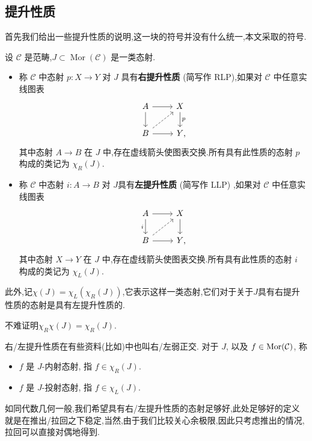 \subsection{提升性质}
首先我们给出一些提升性质的说明,这一块的符号并没有什么统一,本文采取\cite{Land}的符号.
\begin{definition}[提升性质]
    设 $\mathcal{C}$ 是范畴,$J\subset\operatorname{Mor}(\mathcal{C})$ 是一类态射.
    \begin{itemize}
        \item
            称 $\mathcal{C}$ 中态射 $p : X \to Y$ 对 $J$ 具有\textbf{右提升性质} (简写作 RLP),如果对 $\mathcal{C}$ 中任意实线图表
            \[
                \begin{tikzcd}
                    A \ar[r] \ar[d] & X \ar[d,"p"] \\
                    B \ar[r] \ar[ur, dashed] & Y \rlap{,}
                \end{tikzcd}
            \]
            其中态射 $A \to B$ 在 $J$ 中,存在虚线箭头使图表交换.所有具有此性质的态射 $p$ 构成的类记为 $\chi_R(J)$.
        \item
            称 $\mathcal{C}$ 中态射 $i : A \to B$ 对 $J$具有\textbf{左提升性质} (简写作 LLP) ,如果对 $\mathcal{C}$ 中任意实线图表
            \[
                \begin{tikzcd}
                    A \ar[r] \ar[d,"i"'] & X \ar[d] \\
                    B \ar[r] \ar[ur, dashed] & Y \rlap{,}
                \end{tikzcd}
            \]
            其中态射 $X \to Y$ 在 $J$ 中,存在虚线箭头使图表交换.所有具有此性质的态射 $i$ 构成的类记为 $\chi_L(J)$.
    \end{itemize}
    此外,记$\chi(J)=\chi_L(\chi_R(J))$,它表示这样一类态射,它们对于关于$J$具有右提升性质的态射是具有左提升性质的.
\end{definition}
不难证明$\chi_R\chi(J) = \chi_R(J)$.
\begin{remark}\label{注记:弱正交}
    右/左提升性质在有些资料(比如\cite{Kerodon})中也叫右/左弱正交. 对于 $J$, 以及 $f\in \operatorname{Mor}(\cal{C})$, 称
    \begin{itemize}
        \item $f$ 是 $J$-内射态射, 指 $f\in \chi_R(J)$.
        \item $f$ 是 $J$-投射态射, 指 $f\in \chi_L(J)$.
    \end{itemize}
\end{remark}
如同代数几何一般,我们希望具有右/左提升性质的态射足够好,此处足够好的定义就是在推出/拉回之下稳定,当然,由于我们比较关心余极限,因此只考虑推出的情况,拉回可以直接对偶地得到.
